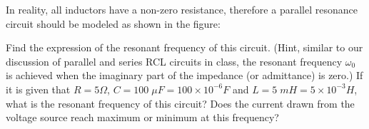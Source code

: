 
\item In reality, all inductors have a non-zero resistance, therefore a 
parallel resonance circuit should be modeled as shown in the figure:


Find the expression of the resonant frequency of this circuit. (Hint,
similar to our discussion of parallel and series RCL circuits in class, 
the resonant frequency $\omega_0$ is achieved when the imaginary part of
the impedance (or admittance) is zero.) If it is given that $R=5\Omega$,
$C=100\;\mu F=100\times 10^{-6}F$ and $L=5\; mH=5\times 10^{-3}H$, what
is the resonant frequency of this circuit? Does the current drawn from 
the voltage source reach maximum or minimum at this frequency?

% 

%
%
% 


